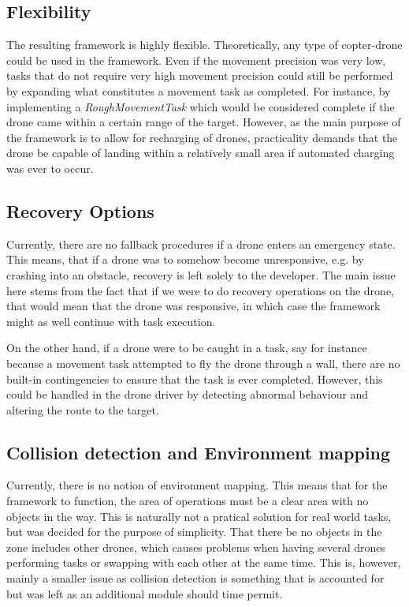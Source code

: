 \subsection{Flexibility}
The resulting framework is highly flexible. Theoretically, any type of copter-drone could be used in the framework. Even if the movement precision was very low, tasks that do not require very high movement precision could still be performed by expanding what constitutes a movement task as completed. For instance, by implementing a \textit{RoughMovementTask} which would be considered complete if the drone came within a certain range of the target. However, as the main purpose of the framework is to allow for recharging of drones, practicality demands that the drone be capable of landing within a relatively small area if automated charging was ever to occur.

\subsection{Recovery Options}
Currently, there are no fallback procedures if a drone enters an emergency state. This means, that if a drone was to somehow become unresponsive, e.g. by crashing into an obstacle, recovery is left solely to the developer. The main issue here stems from the fact that if we were to do recovery operations on the drone, that would mean that the drone was responsive, in which case the framework might as well continue with task execution.

On the other hand, if a drone were to be caught in a task, say for instance because a movement task attempted to fly the drone through a wall, there are no built-in contingencies to ensure that the task is ever completed. However, this could be handled in the drone driver by detecting abnormal behaviour and altering the route to the target.

\subsection{Collision detection and Environment mapping}
Currently, there is no notion of environment mapping. This means that for the framework to function, the area of operations must be a clear area with no  objects in the way. This is naturally not a pratical solution for real world tasks, but was decided for the purpose of simplicity. That there be no objects in the zone includes other drones, which causes problems when having several drones performing tasks or swapping with each other at the same time. This is, however, mainly a smaller issue as collision detection is something that is accounted for but was left as an additional module should time permit.

